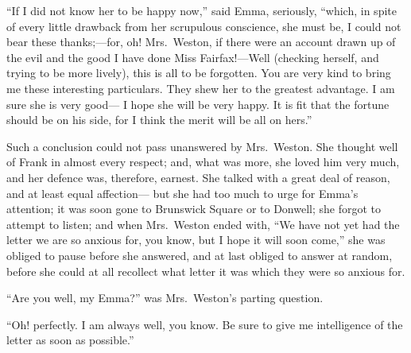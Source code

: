 ``If I did not know her to be happy now,'' said Emma, seriously,
``which, in spite of every little drawback from her scrupulous
conscience, she must be, I could not bear these thanks;---for, oh!
Mrs.\ Weston, if there were an account drawn up of the evil
and the good I have done Miss Fairfax!---Well (checking herself,
and trying to be more lively), this is all to be forgotten.
You are very kind to bring me these interesting particulars.
They shew her to the greatest advantage.  I am sure she is very good---%
I hope she will be very happy.  It is fit that the fortune
should be on his side, for I think the merit will be all on hers.''

Such a conclusion could not pass unanswered by Mrs.\ Weston.
She thought well of Frank in almost every respect; and, what was more,
she loved him very much, and her defence was, therefore, earnest.
She talked with a great deal of reason, and at least equal affection---%
but she had too much to urge for Emma's attention; it was soon gone
to Brunswick Square or to Donwell; she forgot to attempt to listen;
and when Mrs.\ Weston ended with, ``We have not yet had the letter
we are so anxious for, you know, but I hope it will soon come,''
she was obliged to pause before she answered, and at last obliged
to answer at random, before she could at all recollect what letter it
was which they were so anxious for.

``Are you well, my Emma?'' was Mrs.\ Weston's parting question.

``Oh! perfectly.  I am always well, you know.  Be sure to give me
intelligence of the letter as soon as possible.''

